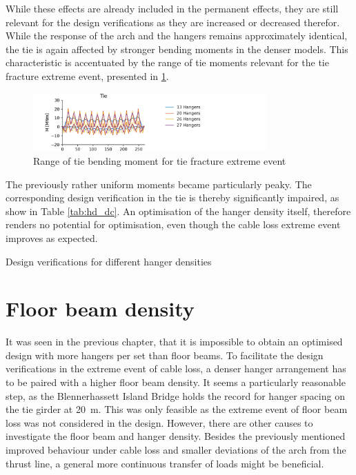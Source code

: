 While these effects are already included in the permanent effects, they are still relevant for the design verifications as they are increased or decreased therefor. While the response of the arch and the hangers remains approximately identical, the tie is again affected by stronger bending moments in the denser models. This characteristic is accentuated by the range of tie moments relevant for the tie fracture extreme event, presented in \cref{fig:hd_tie_fracture}.

\begin{figure}[H]
    \centering
    \includegraphics[trim={0 0 3cm 0},clip, width=0.8\textwidth]{calculations/hanger amount comparison/tie fracture.png}
    \caption{Range of tie bending moment for tie fracture extreme event}
    \label{fig:hd_tie_fracture}
\end{figure}

The previously rather uniform moments became particularly peaky. The corresponding design verification in the tie is thereby significantly impaired, as show in Table \ref{tab:hd_dc}. An optimisation of the hanger density itself, therefore renders no potential for optimisation, even though the cable loss extreme event improves as expected.

\begin{table}[H]
    \centering
    \caption{Design verifications for different hanger densities}
    \label{tab:hd_dc}
    \resizebox{0.85\columnwidth}{!}{%
    
    }
\end{table}


\section{Floor beam density}
It was seen in the previous chapter, that it is impossible to obtain an optimised design with more hangers per set than floor beams. To facilitate the design verifications in the extreme event of cable loss, a denser hanger arrangement has to be paired with a higher floor beam density. It seems a particularly reasonable step, as the Blennerhassett Island Bridge holds the record for hanger spacing on the tie girder at \SI{20}{m}. This was only feasible as the extreme event of floor beam loss was not considered in the design. However, there are other causes to investigate the floor beam and hanger density. Besides the previously mentioned improved behaviour under cable loss and smaller deviations of the arch from the thrust line, a general more continuous transfer of loads might be beneficial. \medskip


